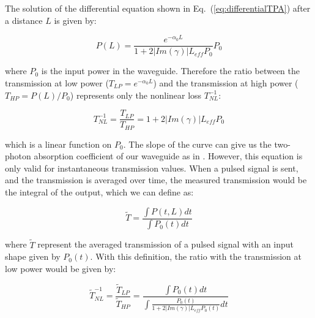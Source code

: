 \documentclass[10pt,letterpaper]{article}
\begin{document}
The solution of the differential equation shown in Eq.~(\ref{eq:differentialTPA}) after a distance $L$ is given by:

\begin{equation}
 P(L) = \frac{e^{-\alpha_0 L}}{1+2|Im(\gamma)| L_{eff} P_0} P_0
\end{equation}

where $P_0$ is the input power in the waveguide. Therefore the ratio between the transmission at low power ($T_{LP} = e^{-\alpha_0 L} $) and the transmission at high power ($T_{HP} = P(L)/P_0 $) represents only the nonlinear loss $T_{NL}^{-1}$:

\begin{equation}
 T_{NL}^{-1} = \frac{T_{LP}}{T_{HP}} = 1+2|Im(\gamma)| L_{eff} P_0
\label{eq:transmissionLinear}
\end{equation}

which is a linear function on $P_0$. The slope of the curve can give us the two-photon absorption coefficient of our waveguide as in \cite{Vallaitis2009}.
However, this equation is only valid for instantaneous transmission values. When a pulsed signal is sent, and the transmission is averaged over time, the measured transmission would be the integral of the output, which we can define as:


\begin{equation}
 \tilde{T}  = \frac{\int P(t,L)dt}{\int P_0(t)dt}
\end{equation}

where $\tilde{T}$ represent the averaged transmission of a pulsed signal with an input shape given by $P_0(t)$. With this definition, the ratio with the transmission at low power would be given by:



\begin{equation}
\tilde{T}_{NL}^{-1} = \frac{\tilde{T}_{LP}}{\tilde{T}_{HP}} = \frac{\int P_0(t)dt}{\int \frac{P_0(t)}{1+2|Im(\gamma)| L_{eff} P_0(t)} dt}
\label{eq:transmissionIntegral}
\end{equation}
\end{document}
